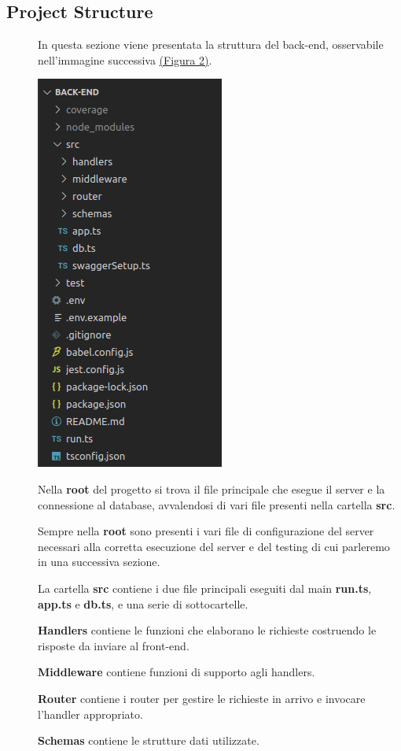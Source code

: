 \documentclass{article}
\begin{document}
\subsection{Project Structure}
\begin{description}
    \item[] In questa sezione viene presentata la struttura del back-end, osservabile nell'immagine successiva \hyperref[img:2]{(Figura 2)}.
    \item[] \label{img:2} \begin{center}
            \includegraphics[scale=0.5]{structure.png}
        \end{center}
    \item[] Nella \textbf{root} del progetto si trova il file principale che esegue il server e la connessione al database, avvalendosi di vari file presenti nella cartella \textbf{src}.
    \item[] Sempre nella \textbf{root} sono presenti i vari file di configurazione del server necessari alla corretta esecuzione del server e del testing di cui parleremo in una successiva sezione.
    \item[] La cartella \textbf{src} contiene i due file principali eseguiti dal main \textbf{run.ts}, \textbf{app.ts} e \textbf{db.ts}, e una serie di sottocartelle.
    \item[] \textbf{Handlers} contiene le funzioni che elaborano le richieste costruendo le risposte da inviare al front-end.
    \item[] \textbf{Middleware} contiene funzioni di supporto agli handlers.
    \item[] \textbf{Router} contiene i router per gestire le richieste in arrivo e invocare l'handler appropriato.
    \item[] \textbf{Schemas} contiene le strutture dati utilizzate.
\end{description}
\clearpage
\end{document}

